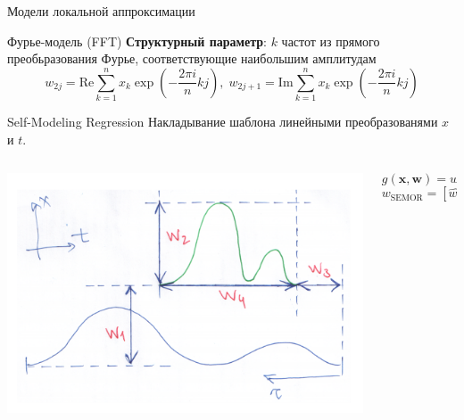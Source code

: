 \documentclass{beamer}
\newcommand{\bx}{\mathbf{x}}
\newcommand{\bw}{\mathbf{w}}
\newcommand{\brs}[1]{\left(#1\right)}
\begin{document}
\begin{frame}{Модели локальной аппроксимации}
    \begin{block}{Фурье-модель (FFT)}
        \textbf{Структурный параметр}: $k$ частот из прямого преобьразования Фурье,
        соответствующие наибольшим амплитудам
        $$
    w_{2j} = \mathrm{Re} \sum_{k=1}^{n} x_k \exp\brs{-\frac{2\pi i}{n}kj}, \; w_{2j + 1} = \mathrm{Im} \sum_{k=1}^{n} x_k \exp\brs{-\frac{2\pi i}{n}kj}
        $$
    \end{block}
    \begin{block}{Self-Modeling Regression}
        Накладывание шаблона линейными преобразованями $x$ и $t$.
        \begin{columns}
            \begin{column}{.44\textwidth}
                \begin{center}
                    \includegraphics[scale=0.18]{../pics/semor_illustration.png}
                \end{center}
            \end{column}
            \begin{column}{.56\textwidth}
                $$
                g(\bx, \bw) = w_1 + w_2 p(w_3 + w_4t),
                $$
                $$
                w_{\text{SEMOR}} = [\hat{w_1}, \hat{w_2}, \hat{w_3}, \hat{w_4}, \rho].
                $$
            \end{column}
        \end{columns}
    \end{block}
\end{frame}
\end{document}

